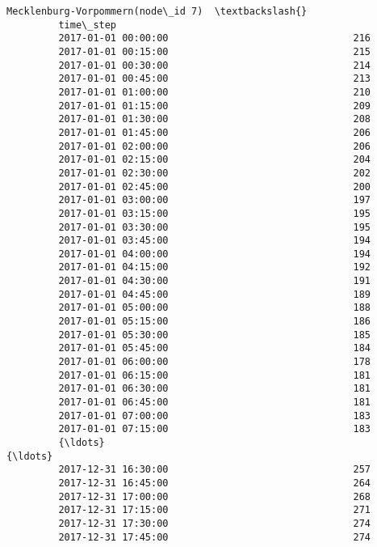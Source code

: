 \documentclass[11pt]{article}
\begin{document}
\begin{Verbatim}[commandchars=\\\{\}]
                              Mecklenburg-Vorpommern(node\_id 7)  \textbackslash{}
         time\_step                                                
         2017-01-01 00:00:00                                216   
         2017-01-01 00:15:00                                215   
         2017-01-01 00:30:00                                214   
         2017-01-01 00:45:00                                213   
         2017-01-01 01:00:00                                210   
         2017-01-01 01:15:00                                209   
         2017-01-01 01:30:00                                208   
         2017-01-01 01:45:00                                206   
         2017-01-01 02:00:00                                206   
         2017-01-01 02:15:00                                204   
         2017-01-01 02:30:00                                202   
         2017-01-01 02:45:00                                200   
         2017-01-01 03:00:00                                197   
         2017-01-01 03:15:00                                195   
         2017-01-01 03:30:00                                195   
         2017-01-01 03:45:00                                194   
         2017-01-01 04:00:00                                194   
         2017-01-01 04:15:00                                192   
         2017-01-01 04:30:00                                191   
         2017-01-01 04:45:00                                189   
         2017-01-01 05:00:00                                188   
         2017-01-01 05:15:00                                186   
         2017-01-01 05:30:00                                185   
         2017-01-01 05:45:00                                184   
         2017-01-01 06:00:00                                178   
         2017-01-01 06:15:00                                181   
         2017-01-01 06:30:00                                181   
         2017-01-01 06:45:00                                181   
         2017-01-01 07:00:00                                183   
         2017-01-01 07:15:00                                183   
         {\ldots}                                                {\ldots}   
         2017-12-31 16:30:00                                257   
         2017-12-31 16:45:00                                264   
         2017-12-31 17:00:00                                268   
         2017-12-31 17:15:00                                271   
         2017-12-31 17:30:00                                274   
         2017-12-31 17:45:00                                274   

\end{Verbatim}
\end{document}
